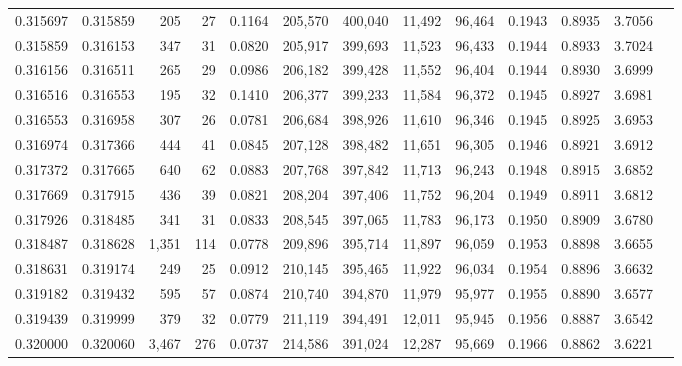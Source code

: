 \begin{tabular}{rrrrrrrrrrrrr}
0.315697 & 0.315859 &   205 &  27 &                                     0.1164 & 205,570 & 400,040 &  11,492 &  96,464 & 0.1943 & 0.8935 & 3.7056 \\
0.315859 & 0.316153 &   347 &  31 &                                     0.0820 & 205,917 & 399,693 &  11,523 &  96,433 & 0.1944 & 0.8933 & 3.7024 \\
0.316156 & 0.316511 &   265 &  29 &                                     0.0986 & 206,182 & 399,428 &  11,552 &  96,404 & 0.1944 & 0.8930 & 3.6999 \\
0.316516 & 0.316553 &   195 &  32 &                                     0.1410 & 206,377 & 399,233 &  11,584 &  96,372 & 0.1945 & 0.8927 & 3.6981 \\
0.316553 & 0.316958 &   307 &  26 &                                     0.0781 & 206,684 & 398,926 &  11,610 &  96,346 & 0.1945 & 0.8925 & 3.6953 \\
0.316974 & 0.317366 &   444 &  41 &                                     0.0845 & 207,128 & 398,482 &  11,651 &  96,305 & 0.1946 & 0.8921 & 3.6912 \\
0.317372 & 0.317665 &   640 &  62 &                                     0.0883 & 207,768 & 397,842 &  11,713 &  96,243 & 0.1948 & 0.8915 & 3.6852 \\
0.317669 & 0.317915 &   436 &  39 &                                     0.0821 & 208,204 & 397,406 &  11,752 &  96,204 & 0.1949 & 0.8911 & 3.6812 \\
0.317926 & 0.318485 &   341 &  31 &                                     0.0833 & 208,545 & 397,065 &  11,783 &  96,173 & 0.1950 & 0.8909 & 3.6780 \\
0.318487 & 0.318628 & 1,351 & 114 &                                     0.0778 & 209,896 & 395,714 &  11,897 &  96,059 & 0.1953 & 0.8898 & 3.6655 \\
0.318631 & 0.319174 &   249 &  25 &                                     0.0912 & 210,145 & 395,465 &  11,922 &  96,034 & 0.1954 & 0.8896 & 3.6632 \\
0.319182 & 0.319432 &   595 &  57 &                                     0.0874 & 210,740 & 394,870 &  11,979 &  95,977 & 0.1955 & 0.8890 & 3.6577 \\
0.319439 & 0.319999 &   379 &  32 &                                     0.0779 & 211,119 & 394,491 &  12,011 &  95,945 & 0.1956 & 0.8887 & 3.6542 \\
0.320000 & 0.320060 & 3,467 & 276 &                                     0.0737 & 214,586 & 391,024 &  12,287 &  95,669 & 0.1966 & 0.8862 & 3.6221 \\

\end{tabular}
